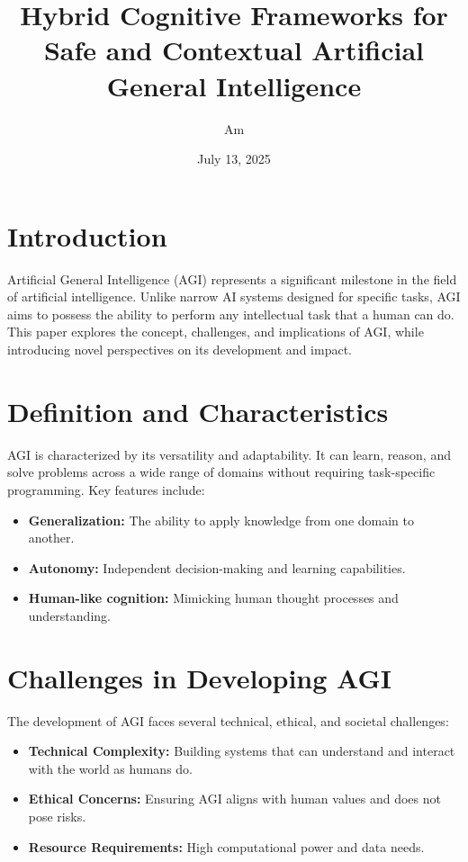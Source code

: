\documentclass[12pt]{article}
\title{Hybrid Cognitive Frameworks for Safe and Contextual Artificial General Intelligence}
\author{Am}
\date{July 13, 2025}
\begin{document}
\maketitle

\section*{Introduction}

Artificial General Intelligence (AGI) represents a significant milestone in the field of artificial intelligence. Unlike narrow AI systems designed for specific tasks, AGI aims to possess the ability to perform any intellectual task that a human can do. This paper explores the concept, challenges, and implications of AGI, while introducing novel perspectives on its development and impact.

\section*{Definition and Characteristics}

AGI is characterized by its versatility and adaptability. It can learn, reason, and solve problems across a wide range of domains without requiring task-specific programming. Key features include:

\begin{itemize}
    \item \textbf{Generalization:} The ability to apply knowledge from one domain to another.
    \item \textbf{Autonomy:} Independent decision-making and learning capabilities.
    \item \textbf{Human-like cognition:} Mimicking human thought processes and understanding.
\end{itemize}

\section*{Challenges in Developing AGI}

The development of AGI faces several technical, ethical, and societal challenges:

\begin{itemize}
    \item \textbf{Technical Complexity:} Building systems that can understand and interact with the world as humans do.
    \item \textbf{Ethical Concerns:} Ensuring AGI aligns with human values and does not pose risks.
    \item \textbf{Resource Requirements:} High computational power and data needs.
\end{itemize}
\end{document}
